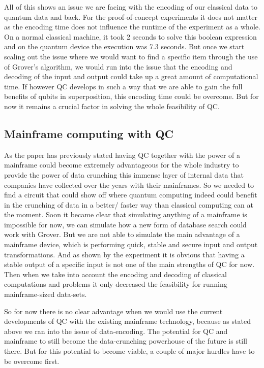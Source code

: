 All of this shows an issue we are facing with the encoding of our classical data to quantum data and back. For the proof-of-concept experiments it does not matter as the encoding time does not influence the runtime of the experiment as a whole. On a normal classical machine, it took 2 seconds to solve this boolean expression and on the quantum device the execution was 7.3 seconds. But once we start scaling out the issue where we would want to find a specific item through the use of Grover's algorithm, we would run into the issue that the encoding and decoding of the input and output could take up a great amount of computational time. If however QC develops in such a way that we are able to gain the full benefits of qubits in superposition, this encoding time could be overcome. But for now it remains a crucial factor in solving the whole feasibility of QC.



\subsection{Mainframe computing with QC}

As the paper has previously stated having QC together with the power of a mainframe could become extremely advantageous for the whole industry to provide the power of data crunching this immense layer of internal data that companies have collected over the years with their mainframes. So we needed to find a circuit that could show off where quantum computing indeed could benefit in the crunching of data in a better/ faster way than classical computing can at the moment. Soon it became clear that simulating anything of a mainframe is impossible for now, we can simulate how a new form of database search could work with Grover. But we are not able to simulate the main advantage of a mainframe device, which is performing quick, stable and secure input and output transformations. And as shown by the experiment it is obvious that having a stable output of a specific input is not one of the main strengths of QC for now. Then when we take into account the encoding and decoding of classical computations and problems it only decreased the feasibility for running mainframe-sized data-sets.


So for now there is no clear advantage when we would use the current developments of QC with the existing mainframe technology, because as stated above we ran into the issue of data-encoding. The potential for QC and mainframe to still become the data-crunching powerhouse of the future is still there. But for this potential to become viable, a couple of major hurdles have to be overcome first.


